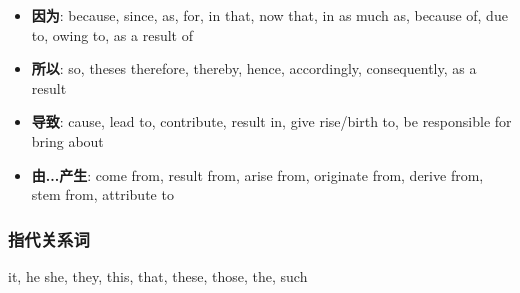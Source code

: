      \begin{itemize}
        \item \textbf{因为}: because, since, as, for, in that, now that,
        in as much as, because of, due to, owing to, as a result of
        \item \textbf{所以}: so, theses therefore, thereby, hence, accordingly,
        consequently, as a result
        \item \textbf{导致}: cause, lead to, contribute, result in,
        give rise/birth to, be responsible for bring about
        \item \textbf{由...产生}: come from, result from, arise from,
        originate from, derive from, stem from, attribute to
      \end{itemize}

    \subsubsection{指代关系词}

      it, he she, they, this, that, these, those, the, such
